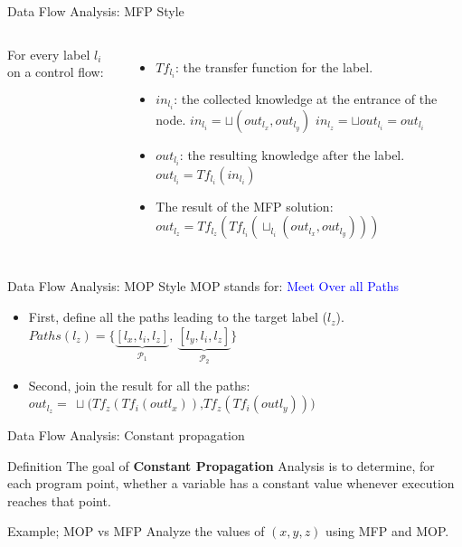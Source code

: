 \begin{frame}{Data Flow Analysis: MFP Style}
\begin{columns}
	\small
	 For every label $l_i$ on a control flow:
\begin{itemize}
	\item $Tf_{l_i}$: the transfer function for the label.
	\item $in_{l_i}$: the collected knowledge at the entrance of the node.
	$in_{l_i}= \sqcup(out_{l_x},out_{l_y})$
	$in_{l_z}=\sqcup out_{l_i}= out_{l_i}$
	\item $out_{l_i}$: the resulting knowledge after the label. $out_{l_i}=Tf_{l_i}(in_{l_i}) $
	\item The result of the MFP solution: $out_{l_z} =  Tf_{l_z}(Tf_{l_i}(\sqcup_{l_i}(out_{l_x},out_{l_y})))$
\end{itemize}


\end{columns}
\end{frame}



\begin{frame}{Data Flow Analysis: MOP Style}
MOP stands for: \textcolor{blue}{Meet Over all Paths }
	\begin{itemize}
		\item First, define all the paths leading to the target label ($l_z$).\\
		$Paths(l_z)=\{\underbrace{[l_x, l_i,l_z]}_{\mathcal{P}_1},~\underbrace{[l_y, l_i,l_z]}_{\mathcal{P}_2}\}$
		\item Second, join the result for all the paths:\\
		$out_{l_z}=~\sqcup\textbf{(}Tf_z(Tf_i(out{l_x}))\textbf{,} Tf_z(Tf_i(out{l_y}))\textbf{)}$
	\end{itemize}
\centering	
\end{frame}

\begin{frame}{Data Flow Analysis: Constant propagation}
\begin{block}{Definition}
The goal of \textbf{Constant Propagation} Analysis is to determine, for each
program point, whether a variable has a constant value whenever
execution reaches that point.
\end{block}

\begin{exampleblock}{Example; MOP vs MFP}	
	Analyze the values of $(x,y,z)$ using MFP and MOP. 
	
\end{exampleblock}	

\end{frame}


